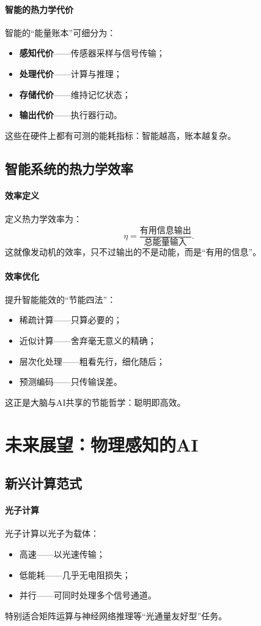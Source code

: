\paragraph{智能的热力学代价}
智能的“能量账本”可细分为：
\begin{itemize}
\item \textbf{感知代价}——传感器采样与信号传输；
\item \textbf{处理代价}——计算与推理；
\item \textbf{存储代价}——维持记忆状态；
\item \textbf{输出代价}——执行器行动。
\end{itemize}
这些在硬件上都有可测的能耗指标：智能越高，账本越复杂。

\subsection{智能系统的热力学效率}

\paragraph{效率定义}
定义热力学效率为：
$$\eta=\frac{\text{有用信息输出}}{\text{总能量输入}}.$$
这就像发动机的效率，只不过输出的不是动能，而是“有用的信息”。

\paragraph{效率优化}
提升智能能效的“节能四法”：
\begin{itemize}
\item 稀疏计算——只算必要的；
\item 近似计算——舍弃毫无意义的精确；
\item 层次化处理——粗看先行，细化随后；
\item 预测编码——只传输误差。
\end{itemize}
这正是大脑与AI共享的节能哲学：\;聪明即高效。

\section{未来展望：物理感知的AI}

\subsection{新兴计算范式}

\paragraph{光子计算}
光子计算以光子为载体：
\begin{itemize}
\item 高速——以光速传输；
\item 低能耗——几乎无电阻损失；
\item 并行——可同时处理多个信号通道。
\end{itemize}
特别适合矩阵运算与神经网络推理等“光通量友好型”任务。

